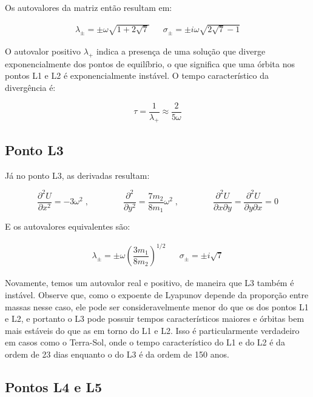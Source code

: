 \vspace{10px}

Os autovalores da matriz então resultam em:

\vspace{-13px}

\begin{align}
\lambda_{\pm} = \pm \omega \sqrt{1+2\sqrt{7}} && \sigma_{\pm} = \pm i\omega \sqrt{2\sqrt{7}-1}
\end{align}

O autovalor positivo $\lambda_+$ indica a presença de uma solução que diverge exponencialmente dos pontos de equilíbrio, o que significa que uma órbita nos pontos L1 e L2 é exponencialmente instável. O tempo característico da divergência é:

\begin{equation}
\tau = \frac{1}{\lambda_+} \approx \frac{2}{5\omega}
\end{equation}

\subsection{Ponto L3}

Já no ponto L3, as derivadas resultam:

\begin{equation}
\dfrac{\partial ^2U}{\partial x^2} = -3\omega^2 \;, \qquad \qquad \dfrac{\partial ^2}{\partial y^2} = \frac{7m_2}{8m_1}\omega^2 \;, \qquad \qquad \dfrac{\partial ^2U}{\partial x\partial y} = \dfrac{\partial ^2U}{\partial y\partial x} = 0
\end{equation}

E os autovalores equivalentes são:

\begin{align}
\lambda_{\pm} = \pm \omega \left(\dfrac{3m_1}{8m_2}\right)^{1/2} && \sigma_{\pm} = \pm i\sqrt{7}
\end{align}

Novamente, temos um autovalor real e positivo, de maneira que L3 também é instável. Observe que, como o expoente de Lyapunov depende da proporção entre massas nesse caso, ele pode ser consideravelmente menor do que os dos pontos L1 e L2, e portanto o L3 pode possuir tempos característicos maiores e órbitas bem mais estáveis do que as em torno do L1 e L2. Isso é particularmente verdadeiro em casos como o Terra-Sol, onde o tempo característico do L1 e do L2 é da ordem de 23 dias enquanto o do L3 é da ordem de 150 anos.

\subsection{Pontos L4 e L5}

